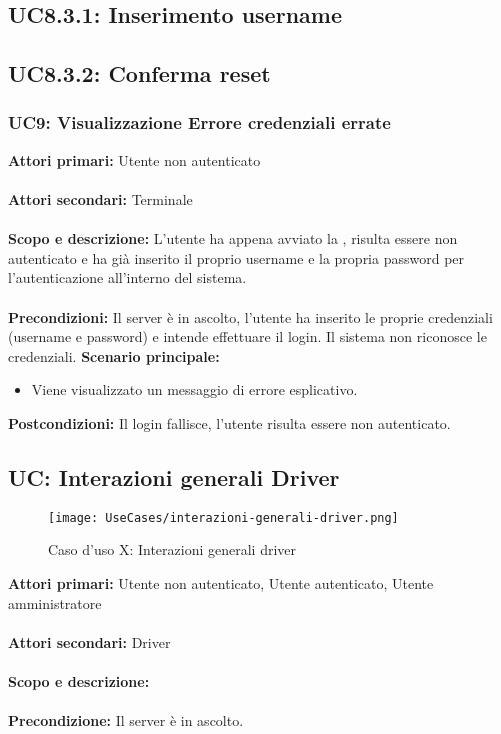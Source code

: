 \documentclass{scalatekids-article}
\begin{document}
\subsection{UC8.3.1: Inserimento username}

\subsection{UC8.3.2: Conferma reset}

\subsubsection{UC9: Visualizzazione Errore credenziali errate}

\textbf{Attori primari:} Utente non autenticato\\ \\
\textbf{Attori secondari:} Terminale\\ \\
\textbf{Scopo e descrizione:}
L'utente ha appena avviato la , risulta essere non autenticato e ha già inserito il proprio username e la propria password per l'autenticazione all'interno del sistema.\\ \\
\textbf{Precondizioni:} Il server è in ascolto, l'utente ha inserito le proprie credenziali (username e password) e intende effettuare il login. Il sistema non riconosce le credenziali.
\textbf{Scenario principale:}
\begin{itemize}
\item Viene visualizzato un messaggio di errore esplicativo.
\end{itemize}
\textbf{Postcondizioni:} Il login fallisce, l'utente risulta essere non autenticato.

\subsection{UC: Interazioni generali Driver}
\begin{figure}[H]
  \begin{center}
    \texttt{[image: UseCases/interazioni-generali-driver.png]}
    \caption*{Caso d'uso X: Interazioni generali driver}
  \end{center}
\end{figure}
\textbf{Attori primari:} Utente non autenticato, Utente autenticato, Utente amministratore\\ \\
\textbf{Attori secondari:} Driver\\ \\
\textbf{Scopo e descrizione:} \\ \\%
\textbf{Precondizione:} Il server è in ascolto.\\ \\
\end{document}

